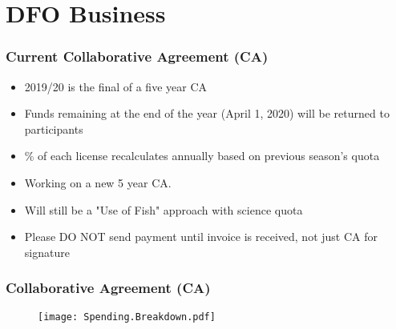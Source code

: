 \documentclass{beamer}
\begin{document}
\section{DFO Business}


\begin{frame}
	
	\frametitle{Current Collaborative Agreement (CA)}
	
	\vspace*{-0.5cm}
	\begin{block}
		
		\begin{itemize}
			\item 2019/20 is the final of a five year CA
			\item Funds remaining at the end of the year (April 1, 2020) will be returned to participants
			\item \% of each license recalculates annually based on previous season's quota
			\item Working on a new 5 year CA.
			\item Will still be a "Use of Fish" approach with science quota
			\item Please DO NOT send payment until invoice is received, not just CA for signature
			
		\end{itemize}
	\end{block}
	
	
\end{frame}



\begin{frame}
	
	\frametitle{Collaborative Agreement (CA)}
	
	\begin{figure}
		
		\vspace*{-0.5cm}
		\centerline{\texttt{[image: Spending.Breakdown.pdf]}}
		
	\end{figure}
\end{frame}

\end{document}
